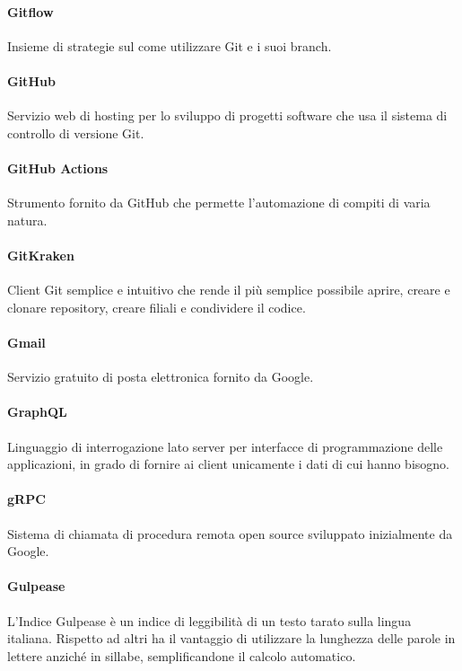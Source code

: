 \documentclass[]{article}
\begin{document}
	\paragraph*{Gitflow}
	Insieme di strategie sul come utilizzare Git e i suoi branch.
	
	\paragraph*{GitHub}
	Servizio web di hosting per lo sviluppo di progetti software che usa il sistema di controllo di versione Git.
	
	\paragraph*{GitHub Actions}
	Strumento fornito da GitHub che permette l’automazione di compiti di varia natura.
	
	\paragraph*{GitKraken}
	Client Git semplice e intuitivo che rende il più semplice possibile aprire, creare e clonare repository, creare filiali e condividere il codice.
	
	\paragraph*{Gmail}
	Servizio gratuito di posta elettronica fornito da Google.
	
	\paragraph*{GraphQL}
	Linguaggio di interrogazione lato server per interfacce di programmazione delle applicazioni, in grado di fornire ai client unicamente i dati di cui hanno bisogno.
	
	\paragraph*{gRPC}
	Sistema di chiamata di procedura remota open source sviluppato inizialmente da Google.
	
	\paragraph*{Gulpease}
	L'Indice Gulpease è un indice di leggibilità di un testo tarato sulla lingua italiana. Rispetto ad altri ha il vantaggio di utilizzare la lunghezza delle parole in lettere anziché in sillabe, semplificandone il calcolo automatico.
	
\end{document}
